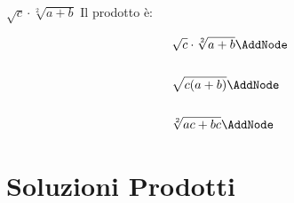 \begin{exercise}
	$\sqrt{c}\cdot\sqrt[2]{a+b}$
	\tcblower
	Il prodotto è:
	\begin{NodesList}
		\begin{align*}
		&\sqrt{c}\cdot\sqrt[2]{a+b}\AddNode\\
		&\\
		&\sqrt{c(a+b)}\AddNode\\
		&\\
		&\sqrt[2]{ac+bc}\AddNode\\
		\end{align*}
				
			\end{NodesList}
		\end{exercise}					

\tcbstoprecording
\newpage
\section{Soluzioni Prodotti}
\tcbinputrecords
\newpage
